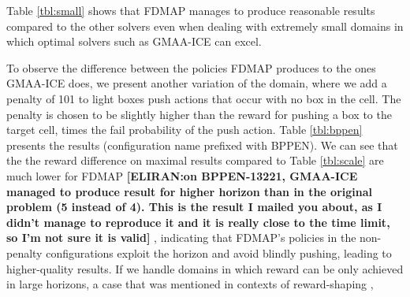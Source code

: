 \documentclass[letterpaper]{article} %
\theoremstyle{definition}
\newcommand{\commentout}[1]{}
\newcommand{\eliran}[1]{\textbf{[\color{red}ELIRAN:#1]}}
\newcommand{\guy}[1]{\textbf{[\color{orange}GUY:#1]}}
\begin{document}
Table \ref{tbl:small} shows that FDMAP manages to produce reasonable results compared to the other solvers even when dealing with extremely small domains in which optimal solvers such as GMAA-ICE can excel.

To observe the difference between the policies FDMAP produces to the ones GMAA-ICE does, we present another variation of the domain, where we add a penalty of 101 to light boxes push actions that occur with no box in the cell. The penalty is chosen to be slightly higher than the reward for pushing a box to the target cell, times the fail probability of the push action. Table \ref{tbl:bppen} presents the results (configuration name prefixed with BPPEN). We can see that the the reward difference on maximal results compared to Table \ref{tbl:scale} are much lower for FDMAP
\eliran{on BPPEN-13221, GMAA-ICE managed to produce result for higher horizon than in the original problem (5 instead of 4). This is the result I mailed you about, as I didn't manage to reproduce it and it is really close to the time limit, so I'm not sure it is valid} , indicating that FDMAP's policies in the non-penalty configurations exploit the horizon and avoid blindly pushing, leading to higher-quality results.
If we handle domains in which reward can be only achieved in large horizons, a case that was mentioned in contexts of reward-shaping \cite{REWARDSHAPING}, 

\commentout{
\section{Related Work}

\guy{This still requires work}
QDec-POMDPs~\cite{QDECPOMDP} are qualitative version of Dec-POMDPS that tackle a conceptually simpler, more structured, model. In QDec-POMDPs 
non-determinism replaces stochastic uncertainty. The model is factored (i.e., described at the level of state variables rather than states), and actions 
are described using preconditions and non-determinstic effects. Although QDec-POMDPs are also NEXT-Time hard, recent work in the area that leverages heuristic-search planners, has been able to scale up to much larger domains (e.g., box pushing on a grid of size 24,  12 agents and 12 boxes, implying a state space of $24^{24}$)
albeit, under the assumptions that actions are deterministic.

Dec-POMDP algorithms.
}
\end{document}

